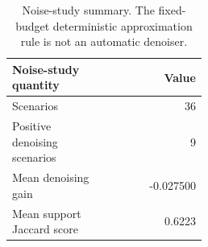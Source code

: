 \begin{table}[tbp]
\centering
\small
\begin{tabular}{L{0.48\linewidth}r}
\toprule
Noise-study quantity & Value\\
\midrule
Scenarios & 36\\
Positive denoising scenarios & 9\\
Mean denoising gain & -0.027500\\
Mean support Jaccard score & 0.6223\\
\bottomrule
\end{tabular}
\caption{Noise-study summary. The fixed-budget deterministic approximation rule is not an automatic denoiser.}
\label{tab:noise-summary-corrected}
\end{table}
